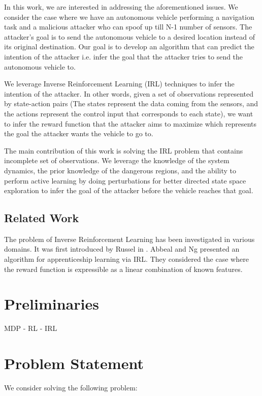 \documentclass[conference]{IEEEtran}
\begin{document}
In this work, we are interested in addressing the aforementioned issues. We consider the case where we have an autonomous vehicle performing a navigation task and a malicious attacker who can spoof up till N-1 number of sensors. The attacker's goal is to send the autonomous vehicle to a desired location instead of its original destination. Our goal is to develop an algorithm that can predict the intention of the attacker i.e. infer the goal that the attacker tries to send the autonomous vehicle to.

We leverage Inverse Reinforcement Learning (IRL) techniques to infer the intention of the attacker. In other words, given a set of observations represented by state-action pairs (The states represent the data coming from the sensors, and the actions represent the control input that corresponds to each state), we want to infer the reward function that the attacker aims to maximize which represents the goal the attacker wants the vehicle to go to. 

The main contribution of this work is solving the IRL problem that contains incomplete set of observations. We leverage the knowledge of the system dynamics, the prior knowledge of the dangerous regions, and the ability to perform active learning by doing perturbations for better directed state space exploration to infer the goal of the attacker before the vehicle reaches that goal.

\subsection{Related Work}\label{subsec:related}
The problem of Inverse Reinforcement Learning has been investigated in various domains. It was first introduced by Russel in \cite{}. Abbeal and Ng \cite{} presented an algorithm for apprenticeship learning via IRL. They considered the case where the reward function is expressible as a linear combination of known features.

\section{Preliminaries}\label{sec:Preliminaries}
MDP - RL - IRL
\section{Problem Statement}\label{sec:problem}
We consider solving the following problem:
\end{document}
